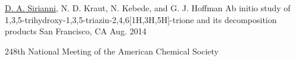 \begin{cventries}

  \cventry
    {\underline{D. A. Sirianni}, N. D. Kraut, N. Kebede, and G. J. Hoffman} %
    {Ab initio study of 1,3,5-trihydroxy-1,3,5-triazin-2,4,6[1H,3H,5H]-trione
     and its decomposition products} %
    {San Francisco, CA} %
    {Aug. 2014} %
    {%
    \begin{cvitems}
    \item[] 248th National Meeting of the American Chemical Society %
    \end{cvitems}
    }

\end{cventries}

